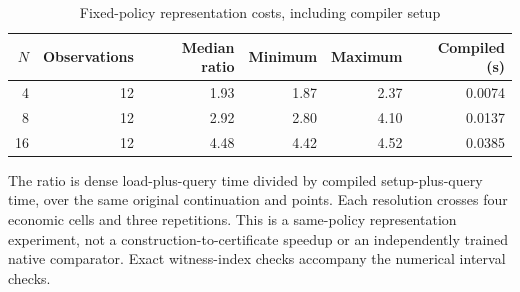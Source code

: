 \begin{table}[htbp]
\centering
\caption{Fixed-policy representation costs, including compiler setup}\label{tab:compiler48}
\footnotesize
\begin{tabular}{rrrrrr}
\toprule
$N$ & Observations & Median ratio & Minimum & Maximum & Compiled (s)\\
\midrule
4 & 12 & 1.93 & 1.87 & 2.37 & 0.0074 \\
8 & 12 & 2.92 & 2.80 & 4.10 & 0.0137 \\
16 & 12 & 4.48 & 4.42 & 4.52 & 0.0385 \\
\bottomrule
\end{tabular}
\begin{minipage}{0.97\linewidth}\footnotesize\vspace{3pt}
The ratio is dense load-plus-query time divided by compiled setup-plus-query time, over the same original continuation and points. Each resolution crosses four economic cells and three repetitions. This is a same-policy representation experiment, not a construction-to-certificate speedup or an independently trained native comparator. Exact witness-index checks accompany the numerical interval checks.
\end{minipage}
\end{table}
